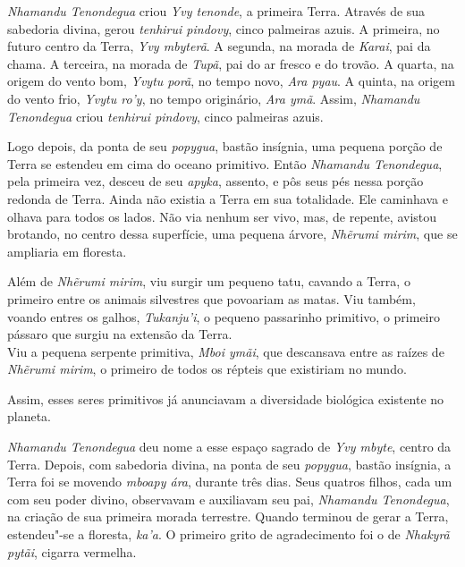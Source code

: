 

 

 



\emph{Nhamandu Tenondegua} criou \emph{Yvy tenonde}, a primeira Terra.
Através de sua sabedoria divina, gerou \emph{tenhirui pindovy}, cinco
palmeiras azuis. A primeira, no futuro centro da Terra, \emph{Yvy
mbyterã}. A segunda, na morada de \emph{Karai}, pai da chama. A terceira, na morada de \emph{Tupã}, pai do ar fresco e do trovão. A quarta, na origem do vento bom, \emph{Yvytu porã}, no tempo novo,
\emph{Ara pyau}. A quinta, na origem do vento frio, \emph{Yvytu ro'y},
no tempo originário, \emph{Ara ymã}. Assim, \emph{Nhamandu Tenondegua}
criou \emph{tenhirui pindovy}, cinco palmeiras azuis{.}

Logo depois, da ponta de seu \emph{popygua}, bastão insígnia, uma
pequena porção de Terra se estendeu em cima do oceano primitivo. Então
\emph{Nhamandu Tenondegua}, pela primeira vez, desceu de seu
\emph{apyka}, assento, e pôs seus pés nessa porção redonda de Terra.
Ainda não existia a Terra em sua totalidade. Ele caminhava e olhava para
todos os lados. Não via nenhum ser vivo, mas, de repente, avistou
brotando, no centro dessa superfície, uma  pequena árvore, \emph{Nhẽrumi
mirim}, que se ampliaria em floresta.




Além de \emph{Nhẽrumi mirim}, viu surgir um pequeno tatu, cavando a
Terra, o primeiro entre os animais silvestres que povoariam as matas.
Viu também, voando entres os galhos, \emph{Tukanju'i}, o pequeno
passarinho primitivo, o primeiro pássaro que surgiu na extensão da
Terra.\\ Viu a pequena serpente primitiva, \emph{Mboi ymãi}, que
descansava entre as raízes de \emph{Nhẽrumi mirim}, o primeiro de todos
os répteis que existiriam no mundo. %

 

Assim, esses seres primitivos já anunciavam a diversidade biológica
existente no planeta.



\emph{Nhamandu Tenondegua} deu nome a esse espaço sagrado de \emph{Yvy
mbyte}, centro da Terra. Depois, com sabedoria divina, na ponta de seu
\emph{popygua}, bastão insígnia, a Terra foi se movendo \emph{mboapy
ára}, durante três dias. Seus quatros filhos, cada um com seu poder
divino, observavam e auxiliavam seu pai, \emph{Nhamandu Tenondegua}, na
criação de sua primeira morada terrestre. Quando terminou de gerar a
Terra, estendeu"-se a floresta, \emph{ka'a}. O primeiro grito de
agradecimento foi o de \emph{Nhakyrã pytãi}, cigarra vermelha.

